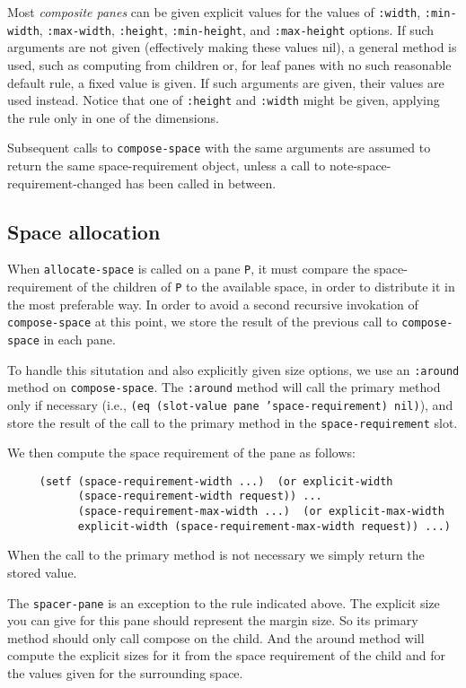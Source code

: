 Most \emph{composite panes} can be given explicit values for the values
of \texttt{:width}, \texttt{:min-width}, \texttt{:max-width},
\texttt{:height}, \texttt{:min-height}, and \texttt{:max-height}
options.  If such arguments are not given (effectively making these
values nil), a general method is used, such as computing from children
or, for leaf panes with no such reasonable default rule, a fixed value
is given.  If such arguments are given, their values are used instead.
Notice that one of \texttt{:height} and \texttt{:width} might be
given, applying the rule only in one of the dimensions.

Subsequent calls to \texttt{compose-space} with the same arguments are
assumed to return the same space-requirement object, unless a call to
note-space-requirement-changed has been called in between.

\subsection{Space allocation}
\label{space-allocation}

When \texttt{allocate-space} is called on a pane \texttt{P}, it must
compare the space-requirement of the children of \texttt{P} to the
available space, in order to distribute it in the most preferable way.
In order to avoid a second recursive invokation of
\texttt{compose-space} at this point, we store the result of the
previous call to \texttt{compose-space} in each pane.

To handle this situtation and also explicitly given size options, we use
an \texttt{:around} method on \texttt{compose-space}.  The
\texttt{:around} method will call the primary method only if necessary
(i.e., \texttt{(eq (slot-value pane 'space-requirement) nil)}), and store
the result of the call to the primary method in the
\texttt{space-requirement} slot.

We then compute the space requirement of the pane as follows:

\begin{verbatim}
     (setf (space-requirement-width ...)  (or explicit-width
           (space-requirement-width request)) ...
           (space-requirement-max-width ...)  (or explicit-max-width
           explicit-width (space-requirement-max-width request)) ...)
\end{verbatim}

When the call to the primary method is not necessary we simply return
the stored value.

The \texttt{spacer-pane} is an exception to the rule indicated above.  The
explicit size you can give for this pane should represent the margin
size.  So its primary method should only call compose on the child.  And
the around method will compute the explicit sizes for it from the space
requirement of the child and for the values given for the surrounding
space.


